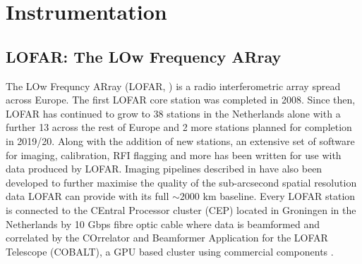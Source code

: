 \onehalfspacing
\chapter{Instrumentation}
\label{chap:inst}
\section{LOFAR: The LOw Frequency ARray}
The LOw Frequncy ARray (LOFAR, \citeauthor{VanHaarlem2013b} \citeyear{VanHaarlem2013b}) is a radio interferometric array spread across Europe. The first LOFAR core station was completed in 2008. Since then, LOFAR has continued to grow to 38 stations in the Netherlands alone with a further 13 across the rest of Europe and 2 more stations planned for completion in 2019/20. Along with the addition of new stations, an extensive set of software for imaging, calibration, RFI flagging and more has been written for use with data produced by LOFAR. Imaging pipelines described in \cite{VanHaarlem2013b} have also been developed to further maximise the quality of the sub-arcsecond spatial resolution data LOFAR can provide with its full $\sim 2000$ km baseline.
Every LOFAR station is connected to the CEntral Processor cluster (CEP) located in Groningen in the Netherlands by 10 Gbps fibre optic cable where data is beamformed and correlated by the COrrelator and Beamformer Application for the LOFAR Telescope (COBALT), a GPU based cluster using commercial components \citep{Broekema2018}.

